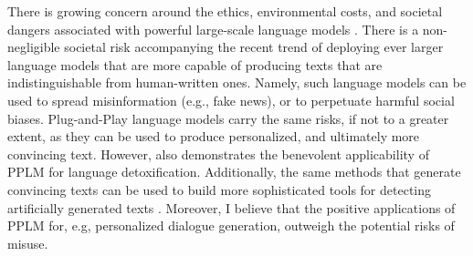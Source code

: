 There is growing concern around the ethics, environmental costs, and societal dangers associated with powerful large-scale language models \citep{brown2020language-models-few-shot-gpt3, bender2021dangers}. There is a non-negligible societal risk accompanying the recent trend of deploying ever larger language models that are more capable of producing texts that are indistinguishable from human-written ones. Namely, such language models can be used to spread misinformation (e.g., fake news), or to perpetuate harmful social biases. Plug-and-Play language models carry the same risks, if not to a greater extent, as they can be used to produce personalized, and ultimately more convincing text. However, \cite{dathathri2019plug} also demonstrates the benevolent applicability of PPLM for language detoxification. Additionally, the same methods that generate convincing texts can be used to build more sophisticated tools for detecting artificially generated texts \cite{gehrmann-etal-2019-gltr}. Moreover, I believe that the positive applications of PPLM for, e.g, personalized dialogue generation, outweigh the potential risks of misuse. 



